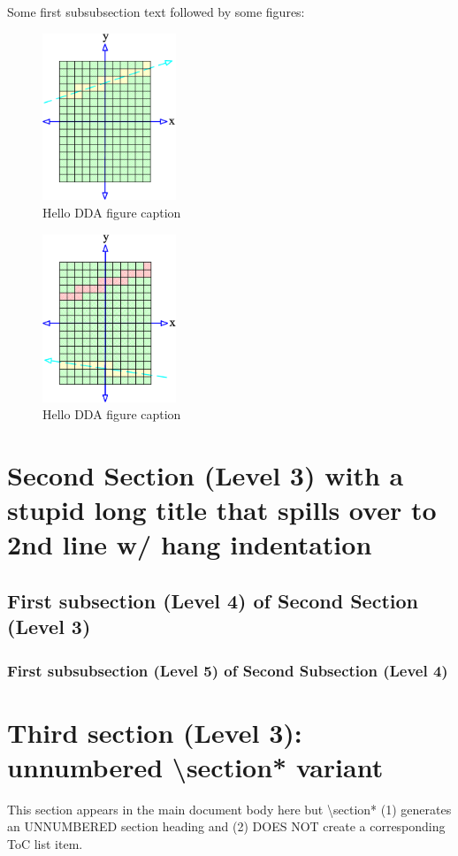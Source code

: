 Some first subsubsection text followed by some figures:
	\begin{figure}
	  \centering
	  \includegraphics[width=4cm]{Space_Carving_1.png}
	  \caption{Hello DDA figure caption }\label{fig:SC-one}
	\end{figure}
	\begin{figure}
	  \centering
	  \includegraphics[width=4cm]{Space_Carving_2.png}
	  \caption{Hello DDA figure caption}\label{fig:SC-two}
	\end{figure}
\section{Second Section (Level 3) with a stupid long title that spills over to 2nd line w/ hang indentation}
\subsection{First subsection (Level 4) of Second Section (Level 3)}
\subsubsection{First subsubsection (Level 5) of Second Subsection (Level 4)}
\section*{Third section (Level 3): unnumbered \textbackslash section* variant}
%
This section appears in the main document body here but \textbackslash section* (1) generates an UNNUMBERED section heading
and (2) DOES NOT create a corresponding ToC list item.

